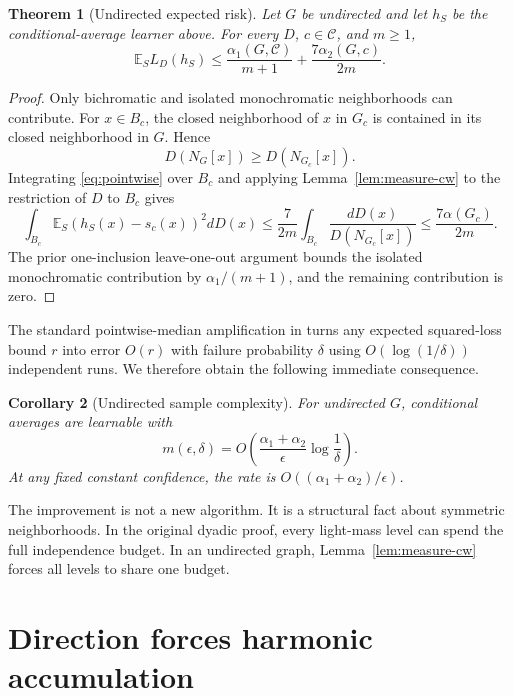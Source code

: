 \documentclass{article}
\newtheorem{theorem}{Theorem}
\newtheorem{corollary}[theorem]{Corollary}
\newcommand{\E}{\mathbb E}
\newcommand{\1}{\mathbf 1}
\begin{document}
\begin{theorem}[Undirected expected risk]\label{thm:undirected-upper}
Let $G$ be undirected and let $h_S$ be the conditional-average learner above. For every $D$, $c\in\mathcal C$, and $m\ge1$,
\begin{equation}
 \E_S L_D(h_S)\le
 \frac{\alpha_1(G,\mathcal C)}{m+1}
 +\frac{7\alpha_2(G,c)}{2m}.
 \label{eq:undirected-risk}
\end{equation}
\end{theorem}

\begin{proof}
Only bichromatic and isolated monochromatic neighborhoods can contribute. For $x\in B_c$, the closed neighborhood of $x$ in $G_c$ is contained in its closed neighborhood in $G$. Hence \[ D(N_G[x])\ge D(N_{G_c}[x]). \] Integrating \eqref{eq:pointwise} over $B_c$ and applying Lemma~\ref{lem:measure-cw} to the restriction of $D$ to $B_c$ gives \[ \int_{B_c}\E_S(h_S(x)-s_c(x))^2dD(x) \le \frac{7}{2m}\int_{B_c}\frac{dD(x)}{D(N_{G_c}[x])} \le\frac{7\alpha(G_c)}{2m}. \] The prior one-inclusion leave-one-out argument bounds the isolated monochromatic contribution by $\alpha_1/(m+1)$, and the remaining contribution is zero.
\end{proof}

The standard pointwise-median amplification in \citet{bressan2026} turns any expected squared-loss bound $r$ into error $O(r)$ with failure probability $\delta$ using $O(\log(1/\delta))$ independent runs. We therefore obtain the following immediate consequence.

\begin{corollary}[Undirected sample complexity]\label{cor:undirected-upper}
For undirected $G$, conditional averages are learnable with \[ m(\epsilon,\delta)=O\!\left( \frac{\alpha_1+\alpha_2}{\epsilon}\log\frac1\delta \right). \] At any fixed constant confidence, the rate is $O((\alpha_1+\alpha_2)/\epsilon)$.
\end{corollary}

The improvement is not a new algorithm. It is a structural fact about symmetric neighborhoods. In the original dyadic proof, every light-mass level can spend the full independence budget. In an undirected graph, Lemma~\ref{lem:measure-cw} forces all levels to share one budget.

\section{Direction forces harmonic accumulation}
\end{document}
